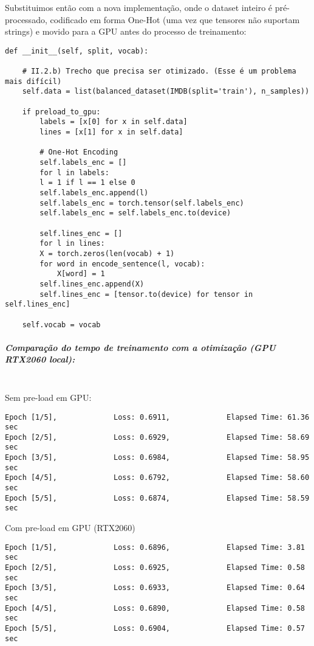 \documentclass[11pt]{article}
\begin{document}
Substituimos então com a nova implementação, onde o dataset inteiro é
pré-processado, codificado em forma One-Hot (uma vez que tensores não
suportam strings) e movido para a GPU antes do processo de treinamento:

\begin{verbatim}
def __init__(self, split, vocab):
    
    # II.2.b) Trecho que precisa ser otimizado. (Esse é um problema mais difícil)
    self.data = list(balanced_dataset(IMDB(split='train'), n_samples))

    if preload_to_gpu:          
        labels = [x[0] for x in self.data]
        lines = [x[1] for x in self.data]

        # One-Hot Encoding
        self.labels_enc = []
        for l in labels:
        l = 1 if l == 1 else 0
        self.labels_enc.append(l)
        self.labels_enc = torch.tensor(self.labels_enc)
        self.labels_enc = self.labels_enc.to(device)

        self.lines_enc = []
        for l in lines:
        X = torch.zeros(len(vocab) + 1)
        for word in encode_sentence(l, vocab):
            X[word] = 1
        self.lines_enc.append(X)
        self.lines_enc = [tensor.to(device) for tensor in self.lines_enc]

    self.vocab = vocab
\end{verbatim}

\subparagraph{Comparação do tempo de treinamento com a otimização (GPU
RTX2060
local):}\label{comparauxe7uxe3o-do-tempo-de-treinamento-com-a-otimizauxe7uxe3o-gpu-rtx2060-local}\mbox{} \\

Sem pre-load em GPU:

\begin{verbatim}
Epoch [1/5],             Loss: 0.6911,             Elapsed Time: 61.36 sec
Epoch [2/5],             Loss: 0.6929,             Elapsed Time: 58.69 sec
Epoch [3/5],             Loss: 0.6984,             Elapsed Time: 58.95 sec
Epoch [4/5],             Loss: 0.6792,             Elapsed Time: 58.60 sec
Epoch [5/5],             Loss: 0.6874,             Elapsed Time: 58.59 sec
\end{verbatim}

Com pre-load em GPU (RTX2060)

\begin{verbatim}
Epoch [1/5],             Loss: 0.6896,             Elapsed Time: 3.81 sec
Epoch [2/5],             Loss: 0.6925,             Elapsed Time: 0.58 sec
Epoch [3/5],             Loss: 0.6933,             Elapsed Time: 0.64 sec
Epoch [4/5],             Loss: 0.6890,             Elapsed Time: 0.58 sec
Epoch [5/5],             Loss: 0.6904,             Elapsed Time: 0.57 sec
\end{verbatim}
\end{document}
